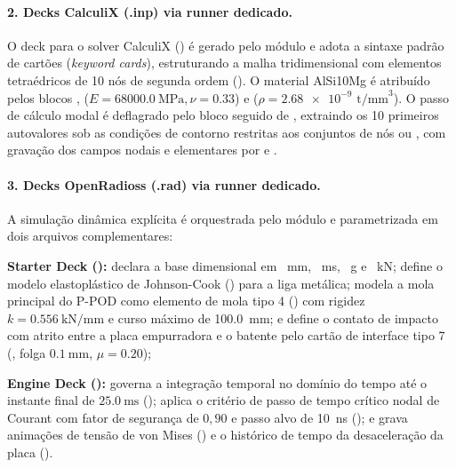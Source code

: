 \paragraph{2. Decks CalculiX (.inp) via runner dedicado.}
O deck para o solver CalculiX () é gerado pelo módulo  e adota a sintaxe padrão de cartões (\textit{keyword cards}), estruturando a malha tridimensional com elementos tetraédricos de 10 nós de segunda ordem (). O material AlSi10Mg é atribuído pelos blocos ,  ($E = \SI{68000.0}{\mega\pascal}, \nu = \num{0.33}$) e  ($\rho = \num{2.68e-9}\text{ t/mm}^3$). O passo de cálculo modal é deflagrado pelo bloco  seguido de , extraindo os 10 primeiros autovalores sob as condições de contorno  restritas aos conjuntos de nós  ou , com gravação dos campos nodais e elementares por  e .

\paragraph{3. Decks OpenRadioss (.rad) via runner dedicado.}
A simulação dinâmica explícita é orquestrada pelo módulo  e parametrizada em dois arquivos complementares:
\begin{alineas}
  \item \textbf{Starter Deck ():} declara a base dimensional em \SI{}{\milli\metre}, \SI{}{\milli\second}, \SI{}{\gram} e \SI{}{\kilo\newton}; define o modelo elastoplástico de Johnson-Cook () para a liga metálica; modela a mola principal do P-POD como elemento de mola tipo 4 () com rigidez $k = \SI{0.556}{\kilo\newton\per\milli\metre}$ e curso máximo de \SI{100.0}{\milli\metre}; e define o contato de impacto com atrito entre a placa empurradora e o batente pelo cartão de interface tipo 7 (, folga $\SI{0.1}{\milli\metre}$, $\mu = \num{0.20}$);
  \item \textbf{Engine Deck ():} governa a integração temporal no domínio do tempo até o instante final de $\SI{25.0}{\milli\second}$ (); aplica o critério de passo de tempo crítico nodal de Courant com fator de segurança de $0{,}90$ e passo alvo de \SI{10}{\nano\second} (); e grava animações de tensão de von Mises () e o histórico de tempo da desaceleração da placa ().
\end{alineas}

